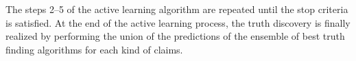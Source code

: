The steps 2--5 of the active learning algorithm are repeated until the stop criteria is satisfied. 
At the end of the active learning process, the truth discovery is finally realized by performing 
the union of the predictions of the ensemble of best truth finding algorithms for each kind of claims. 

